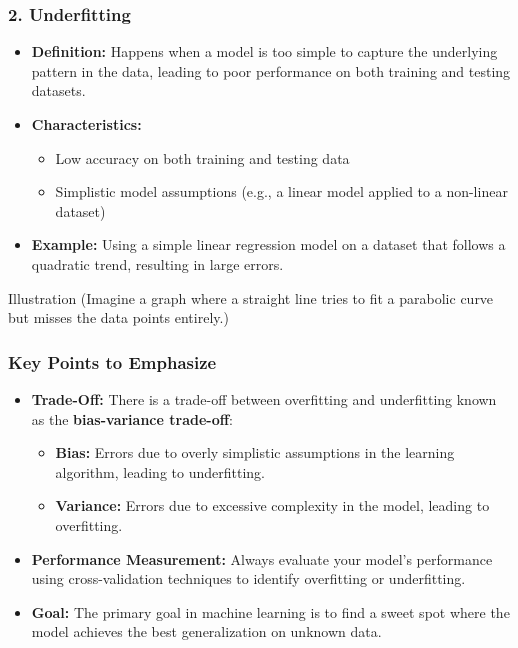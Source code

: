 \documentclass[aspectratio=169]{beamer}
\begin{document}
\begin{frame}[fragile]
    \frametitle{2. Underfitting}
    \begin{itemize}
        \item \textbf{Definition:} Happens when a model is too simple to capture the underlying pattern in the data, leading to poor performance on both training and testing datasets.
        \item \textbf{Characteristics:}
        \begin{itemize}
            \item Low accuracy on both training and testing data
            \item Simplistic model assumptions (e.g., a linear model applied to a non-linear dataset)
        \end{itemize}
        \item \textbf{Example:} Using a simple linear regression model on a dataset that follows a quadratic trend, resulting in large errors.
    \end{itemize}
    \begin{block}{Illustration}
        (Imagine a graph where a straight line tries to fit a parabolic curve but misses the data points entirely.)
    \end{block}
\end{frame}

\begin{frame}[fragile]
    \frametitle{Key Points to Emphasize}
    \begin{itemize}
        \item \textbf{Trade-Off:} There is a trade-off between overfitting and underfitting known as the \textbf{bias-variance trade-off}:
        \begin{itemize}
            \item \textbf{Bias:} Errors due to overly simplistic assumptions in the learning algorithm, leading to underfitting.
            \item \textbf{Variance:} Errors due to excessive complexity in the model, leading to overfitting.
        \end{itemize}
        \item \textbf{Performance Measurement:} Always evaluate your model's performance using cross-validation techniques to identify overfitting or underfitting.
        \item \textbf{Goal:} The primary goal in machine learning is to find a sweet spot where the model achieves the best generalization on unknown data.
    \end{itemize}
\end{frame}
\end{document}
